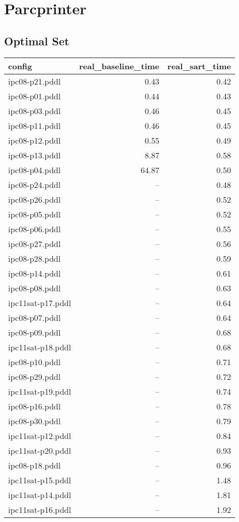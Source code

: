 \documentclass{article}
\begin{document}
                \newpage \section{Parcprinter}
                    \subsection*{Optimal Set}
                    
                            \begin{center}
                            \scriptsize
                            \begin{tabular}{@{}l|r|r@{}}
                            config & real\_baseline\_time & real\_sart\_time\\\midrule
                             ipc08-p21.pddl&0.43&0.42\\
 ipc08-p01.pddl&0.44&0.43\\
 ipc08-p03.pddl&0.46&0.45\\
 ipc08-p11.pddl&0.46&0.45\\
 ipc08-p12.pddl&0.55&0.49\\
 ipc08-p13.pddl&8.87&0.58\\
 ipc08-p04.pddl&64.87&0.50\\
 ipc08-p24.pddl&--&0.48\\
 ipc08-p26.pddl&--&0.52\\
 ipc08-p05.pddl&--&0.52\\
 ipc08-p06.pddl&--&0.55\\
 ipc08-p27.pddl&--&0.56\\
 ipc08-p28.pddl&--&0.59\\
 ipc08-p14.pddl&--&0.61\\
 ipc08-p08.pddl&--&0.63\\
 ipc11sat-p17.pddl&--&0.64\\
 ipc08-p07.pddl&--&0.64\\
 ipc08-p09.pddl&--&0.68\\
 ipc11sat-p18.pddl&--&0.68\\
 ipc08-p10.pddl&--&0.71\\
 ipc08-p29.pddl&--&0.72\\
 ipc11sat-p19.pddl&--&0.74\\
 ipc08-p16.pddl&--&0.78\\
 ipc08-p30.pddl&--&0.79\\
 ipc11sat-p12.pddl&--&0.84\\
 ipc11sat-p20.pddl&--&0.93\\
 ipc08-p18.pddl&--&0.96\\
 ipc11sat-p15.pddl&--&1.48\\
 ipc11sat-p14.pddl&--&1.81\\
 ipc11sat-p16.pddl&--&1.92
                            \end{tabular}
                            \end{center}
                    
\end{document}
